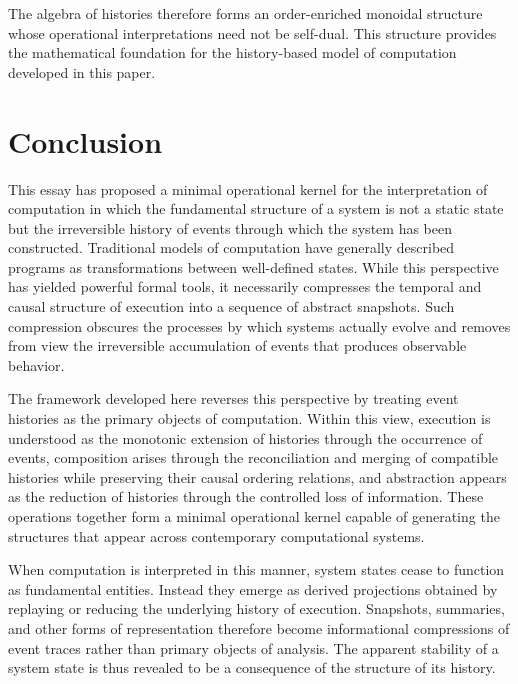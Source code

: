 \documentclass[12pt]{article}
\begin{document}
The algebra of histories therefore forms an order-enriched monoidal
structure whose operational interpretations need not be self-dual. This
structure provides the mathematical foundation for the history-based
model of computation developed in this paper.


\section{Conclusion}

This essay has proposed a minimal operational kernel for the
interpretation of computation in which the fundamental structure
of a system is not a static state but the irreversible history
of events through which the system has been constructed.
Traditional models of computation have generally described
programs as transformations between well-defined states.
While this perspective has yielded powerful formal tools,
it necessarily compresses the temporal and causal structure
of execution into a sequence of abstract snapshots.
Such compression obscures the processes by which systems
actually evolve and removes from view the irreversible
accumulation of events that produces observable behavior.

The framework developed here reverses this perspective by
treating event histories as the primary objects of computation.
Within this view, execution is understood as the monotonic
extension of histories through the occurrence of events,
composition arises through the reconciliation and merging
of compatible histories while preserving their causal
ordering relations, and abstraction appears as the reduction
of histories through the controlled loss of information.
These operations together form a minimal operational kernel
capable of generating the structures that appear across
contemporary computational systems.

When computation is interpreted in this manner, system states
cease to function as fundamental entities. Instead they emerge
as derived projections obtained by replaying or reducing the
underlying history of execution. Snapshots, summaries, and
other forms of representation therefore become informational
compressions of event traces rather than primary objects of
analysis. The apparent stability of a system state is thus
revealed to be a consequence of the structure of its history.
\end{document}
